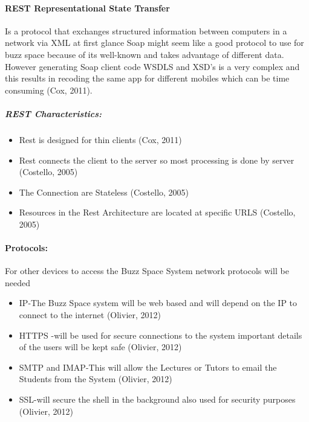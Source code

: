 \paragraph{REST Representational State Transfer}
\begin{description}
\item \hspace{4ex}
Is a protocol that exchanges structured information between computers in a network via XML at first glance Soap might seem like a good protocol to use for buzz space because of its well-known and takes advantage of different data.\\  However generating Soap client code WSDLS and XSD’s is a very complex and this results in recoding the same app for different mobiles which can be time consuming  (Cox, 2011).
\end{description}

\subparagraph{REST Characteristics:}
	\begin{itemize}
	\item Rest is designed for thin clients  (Cox, 2011)
	\item Rest connects the client to the server so most processing is done by server (Costello, 2005)
	\item The Connection are Stateless (Costello, 2005)
 	\item Resources in the Rest Architecture are located at specific URLS (Costello, 2005)
	\end{itemize}

\paragraph{Protocols:}
For other devices to access the Buzz Space System network protocols will be needed
\begin{itemize}
\item IP-The Buzz Space system will be web based and will depend on the IP to connect to the internet (Olivier, 2012)
\item HTTPS -will be used for secure connections to the system important details of the users will be kept safe (Olivier, 2012)
\item SMTP and IMAP-This will allow the Lectures or Tutors to email the Students from the System (Olivier, 2012)
\item SSL-will secure the shell in the background also used for security purposes (Olivier, 2012)
\end{itemize}





